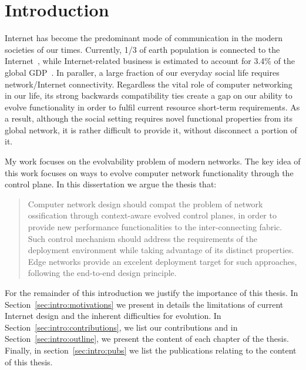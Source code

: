 \chapter{Introduction} \ifpdf
\graphicspath{{Introduction/IntroductionFigs/PNG/}{Introduction/IntroductionFigs/PDF/}{Introduction/IntroductionFigs/}}
\else
\graphicspath{{Introduction/IntroductionFigs/EPS/}{Introduction/IntroductionFigs/}}
\fi

Internet has become the predominant mode of communication in the modern
societies of our times. Currently, 1/3 of earth population is connected to the
Internet~\cite{itufacts2011}, while Internet-related business is estimated to
account for 3.4\% of the global GDP~\cite{duRausas:2011un}. In paraller, a large
fraction of our everyday social life requires network/Internet connectivity.
Regardless the vital role of computer networking in our life, its strong
backwards compatibility ties create a gap on our ability to evolve functionality
in order to fulfil current resource short-term requirements. As a result,
although the social setting requires novel functional properties from its global
network, it is rather difficult to provide it, without disconnect a portion of
it.

My work focuses on the evolvability problem of modern networks. The key idea of
this work focuses on ways to evolve computer network functionality through the
control plane. In this dissertation we argue the thesis that: 

\begin{quotation} 
  Computer network design should compat the problem of network
  ossification through context-aware evolved control planes, in order to provide
  new performance functionalities to the inter-connecting fabric. Such control
  mechanism should address the requirements of the deployment environment
  while taking advantage of its distinct properties. Edge networks provide an 
  excelent deployment target for such approaches, following the end-to-end
  design principle. 
\end{quotation}

For the remainder of this introduction we justify the importance of this thesis.
In Section~\ref{sec:intro:motivations} we present in details the limitations of
current Internet design and the inherent difficulties for evolution. In Section~\ref{sec:intro:contributions}, we list our contributions and
in Section~\ref{sec:intro:outline}, we present the content of each chapter of
the thesis. Finally, in section~\ref{sec:intro:pubs} we list the publications
relating to the content of this thesis. 

